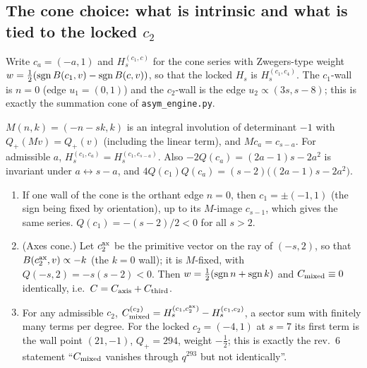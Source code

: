 \subsection{The cone choice: what is intrinsic and what is tied to the locked $c_2$}\label{sec:rev7cone}
Write $c_a=(-a,1)$ and $H_s^{(c_1,c)}$ for the cone series with Zwegers-type weight $w=\tfrac12(\operatorname{sgn} B(c_1,v)-\operatorname{sgn} B(c,v))$, so that the locked $H_s$ is $H_s^{(c_1,c_4)}$. The $c_1$-wall is $n=0$ (edge $u_1=(0,1)$) and the $c_2$-wall is the edge $u_2\propto(3s,s-8)$; this is exactly the summation cone of \texttt{asym\_engine.py}.
\begin{proposition}\label{prop:Minv7}
$M(n,k)=(-n-sk,k)$ is an integral involution of determinant $-1$ with $Q_+(Mv)=Q_+(v)$ (including the linear term), and $Mc_a=c_{s-a}$. For admissible $a$, $H_s^{(c_1,c_a)}=H_s^{(c_1,c_{s-a})}$. Also $-2Q(c_a)=(2a-1)s-2a^2$ is invariant under $a\leftrightarrow s-a$, and $4Q(c_1)Q(c_a)=(s-2)\big((2a-1)s-2a^2\big)$.
\end{proposition}
\begin{proposition}\label{prop:axes7}
\begin{enumerate}[label=(\roman*)]
\item If one wall of the cone is the orthant edge $n=0$, then $c_1=\pm(-1,1)$ (the sign being fixed by orientation), up to its $M$-image $c_{s-1}$, which gives the same series. $Q(c_1)=-(s-2)/2<0$ for all $s>2$.
\item (Axes cone.) Let $c_2^{\rm ax}$ be the primitive vector on the ray of $(-s,2)$, so that $B(c_2^{\rm ax},v)\propto-k$ (the $k=0$ wall); it is $M$-fixed, with $Q(-s,2)=-s(s-2)<0$. Then $w=\tfrac12(\operatorname{sgn} n+\operatorname{sgn} k)$ and $C_{\mathrm{mixed}}\equiv0$ identically, i.e.\ $C=C_{\mathrm{axis}}+C_{\mathrm{third}}$.
\item For any admissible $c_2$, $C_{\mathrm{mixed}}^{(c_2)}=H_s^{(c_1,c_2^{\rm ax})}-H_s^{(c_1,c_2)}$, a sector sum with finitely many terms per degree. For the locked $c_2=(-4,1)$ at $s=7$ its first term is the wall point $(21,-1)$, $Q_+=294$, weight $-\tfrac12$; this is exactly the rev.~6 statement ``$C_{\mathrm{mixed}}$ vanishes through $q^{293}$ but not identically''.
\end{enumerate}
\end{proposition}
